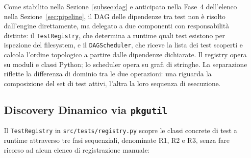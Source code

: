 Come stabilito nella Sezione~\ref{subsec:dag} e anticipato nella Fase~4 dell'elenco nella Sezione~\ref{sec:pipeline}, il \gls{DAG} delle dipendenze tra test non è risolto dall'engine direttamente, ma delegato a due componenti con responsabilità distinte: il \texttt{TestRegistry}, che determina a runtime quali test esistono per ispezione del filesystem, e il \texttt{DAGScheduler}, che riceve la lista dei test scoperti e calcola l'ordine topologico a partire dalle dipendenze dichiarate. Il registry opera su moduli e classi Python; lo scheduler opera su grafi di stringhe. La separazione riflette la differenza di dominio tra le due operazioni: una riguarda la composizione del set di test attivi, l'altra la loro sequenza di esecuzione.


\subsection{Discovery Dinamico via \texttt{pkgutil}}\label{subsec:discovery-impl}

Il \texttt{TestRegistry} in \texttt{src/tests/registry.py} scopre le classi concrete di test a runtime attraverso tre fasi sequenziali, denominate R1, R2 e R3, senza fare ricorso ad alcun elenco di registrazione manuale:

